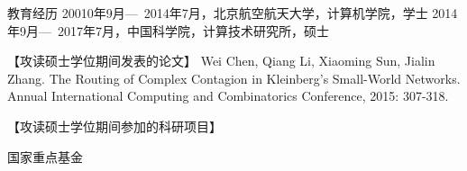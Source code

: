 
\begin{resume}

\begin{resumelist*}{教育经历}
\resumelistitem 20010年9月---~2014年7月，北京航空航天大学，计算机学院，学士
\resumelistitem 2014年9月---~2017年7月，中国科学院，计算技术研究所，硕士
\end{resumelist*}

\begin{resumelist}{【攻读硕士学位期间发表的论文】}
\resumelistitem Wei Chen, Qiang Li, Xiaoming Sun, Jialin Zhang. The Routing of Complex Contagion in Kleinberg's Small-World Networks. Annual International Computing and Combinatorics Conference, 2015: 307-318.
\end{resumelist}

\begin{resumelist}{【攻读硕士学位期间参加的科研项目】}

\resumelistitem 国家重点基金

\end{resumelist}

\end{resume}
